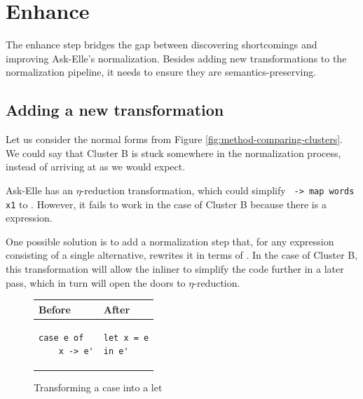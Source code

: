 
\section{Enhance}
\label{sec:method-enhance}

The enhance step bridges the gap between discovering shortcomings and improving Ask-Elle's normalization. Besides adding new transformations to the normalization pipeline, it needs to ensure they are semantics-preserving.

\subsection{Adding a new transformation}

Let us consider the normal forms from Figure \ref{fig:method-comparing-clusters}. We could say that Cluster B is stuck somewhere in the normalization process, instead of arriving at  as we would expect.

Ask-Elle has an $\eta$-reduction transformation, which could simplify \texttt{ -> map words x1} to . However, it fails to work in the case of Cluster B because there is a  expression.


One possible solution is to add a normalization step that, for any  expression consisting of a single alternative, rewrites it in terms of . In the case of Cluster B, this transformation will allow the inliner to simplify the code further in a later pass, which in turn will open the doors to $\eta$-reduction.

\begin{figure}[H]
\centering
\begin{tabular}{ m{8em} | m{8em} }
    Before & After \\
    \hline
    \begin{verbatim}
case e of
    x -> e'
    \end{verbatim}
    &
    \begin{verbatim}
let x = e
in e'
    \end{verbatim}
\end{tabular}
\caption{Transforming a case into a let}
\label{fig:method-case-to-let}
\end{figure}


